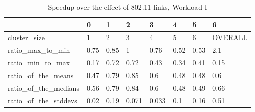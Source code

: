 \begin{table}[H]
\centering
\begin{tabular}{llllllll}
\toprule
{} &    0 &    1 &     2 &     3 &    4 &    5 &        6 \\
\midrule
cluster\_size         &    1 &    2 &     3 &     4 &    5 &    6 &  OVERALL \\
ratio\_max\_to\_min     & 0.75 & 0.85 &     1 &  0.76 & 0.52 & 0.53 &      2.1 \\
ratio\_min\_to\_max     & 0.17 & 0.72 &  0.72 &  0.43 & 0.34 & 0.41 &     0.15 \\
ratio\_of\_the\_means   & 0.47 & 0.79 &  0.85 &   0.6 & 0.48 & 0.48 &      0.6 \\
ratio\_of\_the\_medians & 0.56 & 0.79 &  0.84 &   0.6 & 0.48 & 0.49 &     0.66 \\
ratio\_of\_the\_stddevs & 0.02 & 0.19 & 0.071 & 0.033 &  0.1 & 0.16 &     0.51 \\
\bottomrule
\end{tabular}
\caption{Speedup over the effect of 802.11 links, Workload I}
\label{table:wlan_v_eth_i_speedup}
\end{table}





